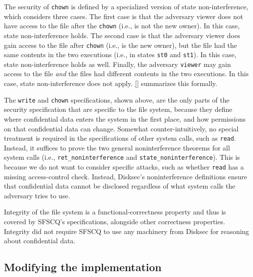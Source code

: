 The security of \texttt{chown} is defined by a specialized version of
state non-interference, which considers three cases.  The first case
is that the adversary {viewer} does not have access to the file
after the \texttt{chown} (i.e., is not the new owner).
In this case, state non-interference holds.
The second case is that the adversary {viewer} does gain access to
the file after \texttt{chown} (i.e., is the new owner),
but the file had the same contents in the
two executions (i.e., in states \texttt{st0} and \texttt{st1}).  In this case,
state non-interference holds as well.  Finally, the adversary \texttt{viewer}
may gain access to the file \emph{and} the files had different contents in
the two executions.  In this case, state non-interference does not apply.
\ref{} summarizes this formally.

%  

The \texttt{write} and \texttt{chown} specifications, shown above, are the only
parts of the security specification that are specific to the file system,
because they define where confidential data enters the system in the
first place, and how permissions on that confidential data can change.
Somewhat counter-intuitively, no special treatment is required in the
specifications of other system calls, such as \texttt{read}.  Instead, it suffices to
prove the two general noninterference theorems for all system calls
(i.e., \texttt{ret\_noninterference} and \texttt{state\_noninterference}).
This is because we do not want to consider specific attacks, such as
whether \texttt{read} has a missing access-control check.  Instead, Disksec's
noninterference definitions ensure that confidential data cannot be
disclosed regardless of what system calls the adversary tries to use.

Integrity of the file system is a functional-correctness property
and thus is covered by SFSCQ's specifications, alongside other
correctness properties.
Integrity did not require SFSCQ to use any machinery from Disksec for
reasoning about confidential data.


\subsection{Modifying the implementation}
\label{s:fs:impl}


